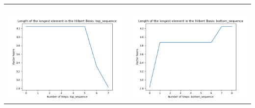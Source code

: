 \documentclass[10pt]{article}
\begin{document}
\begin{tabular}{c|c}
\begin{minipage}{.45\textwidth}
\end{minipage} \\ \\
\hline \\\begin{minipage}{.45\textwidth}
\includegraphics[width=\textwidth]{"DATA/5d/5 generators 2 bound J/top_sequence LENGTH"}
\end{minipage} &
\begin{minipage}{.45\textwidth}
\includegraphics[width=\textwidth]{"DATA/5d/5 generators 2 bound J bottomup/bottom_sequence LENGTH"}
\end{minipage}
\end{tabular}
\end{document}
